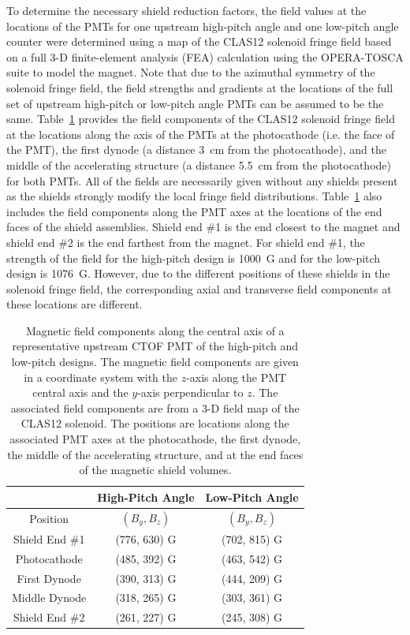 \documentclass[3p,times,twocolumn]{elsarticle}
\begin{document}
To determine the necessary shield reduction factors, the field values at the locations of the PMTs for one
upstream high-pitch angle and one low-pitch angle counter were determined using a map of the CLAS12 solenoid
fringe field based on a full 3-D finite-element analysis (FEA) calculation using the OPERA-TOSCA suite to model
the magnet. Note that due to the azimuthal symmetry of the solenoid fringe field, the field strengths and
gradients at the locations of the full set of upstream high-pitch or low-pitch angle PMTs can be assumed to be
the same. Table~\ref{field-position} provides the field components of the CLAS12 solenoid fringe field at the
locations along the axis of the PMTs at the photocathode (i.e. the face of the PMT), the first dynode (a distance
3~cm from the photocathode), and the middle of the accelerating structure (a distance 5.5~cm from the
photocathode) for both PMTs. All of the fields are necessarily given without any shields present as the shields
strongly modify the local fringe field distributions. Table~\ref{field-position} also includes the field components
along the PMT axes at the locations of the end faces of the shield assemblies. Shield end \#1 is the end closest
to the magnet and shield end \#2 is the end farthest from the magnet. For shield end \#1, the strength of the
field for the high-pitch design is 1000~G and for the low-pitch design is 1076~G. However, due to the different
positions of these shields in the solenoid fringe field, the corresponding axial and transverse field components at
these locations are different.

\begin{table}[htbp]
\begin{center}
\begin{tabular} {c|c|c} \hline
               & High-Pitch Angle & Low-Pitch Angle \\ \hline
Position       & $(B_y,B_z)$      & $(B_y,B_z)$  \\
Shield End \#1 & (776, 630) G   & (702, 815) G \\
Photocathode   & (485, 392) G    & (463, 542) G \\
First Dynode   & (390, 313) G     & (444, 209) G \\ 
Middle Dynode  & (318, 265) G   & (303, 361) G \\ 
Shield End \#2 & (261, 227) G   & (245, 308) G \\ \hline
\end{tabular}
\end{center}
\caption{Magnetic field components along the central axis of a representative upstream CTOF PMT of the
high-pitch and low-pitch designs. The magnetic field components are given in a coordinate system with the
$z$-axis along the PMT central axis and the $y$-axis perpendicular to $z$. The associated field components
are from a 3-D field map of the CLAS12 solenoid. The positions are locations along the associated PMT axes
at the photocathode, the first dynode, the middle of the accelerating structure, and at the end faces of the
magnetic shield volumes.}
\label{field-position}
\end{table}
\end{document}
